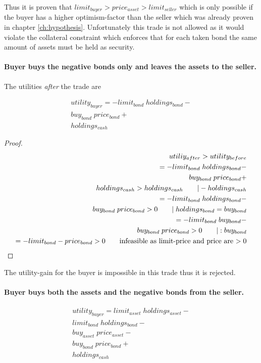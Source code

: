 \documentclass[Bachelorarbeit.tex]{subfiles}
\begin{document}
Thus it is proven that $limit_{buyer} > price_{asset} > limit_{seller}$ which is only possible if the buyer has a higher optimism-factor than the seller which was already proven in chapter \ref{ch:hypothesis}. Unfortunately this trade is not allowed as it would violate the collateral constraint which enforces that for each taken bond the same amount of assets must be held as security. 

\paragraph{Buyer buys the negative bonds only and leaves the assets to the seller.}
The utilities \textit{after} the trade are

\begin{align*}
	utility_{buyer} = -limit_{bond} \; holdings_{bond} - \\
				buy_{bond} \; price_{bond} + \\
				holdings_{cash}
\end{align*}

\begin{proof}
\begin{align*}
	utiliy_{after} > utility_{before} 
		\\ = -limit_{bond} \; holdings_{bond} - \\
				buy_{bond} \; price_{bond} + \\
				holdings_{cash} > holdings_{cash}		\tag*{$| -holdings_{cash}$}
		\\ = -limit_{bond} \; holdings_{bond} - \\
				buy_{bond} \; price_{bond} > 0			\tag*{$| \; holdings_{bond} = buy_{bond}$}
		\\ = -limit_{bond} \; buy_{bond} - \\
			buy_{bond} \; price_{bond} > 0				\tag*{$|:buy_{bond}$}
		\\ = -limit_{bond} - price_{bond} > 0			\tag*{infeasible as limit-price and price are $> 0$}
\end{align*}
\end{proof}

The utility-gain for the buyer is impossible in this trade thus it is rejected.

\paragraph{Buyer buys both the assets and the negative bonds from the seller.}
\begin{align*}
	utility_{buyer} = limit_{asset} \; holdings_{asset} - \\
				limit_{bond} \; holdings_{bond} - \\
				buy_{asset} \; price_{asset} - \\
				buy_{bond} \; price_{bond} + \\
				holdings_{cash}
\end{align*}
\end{document}
